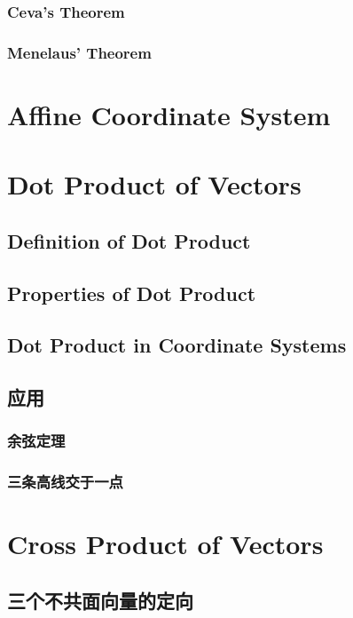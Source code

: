 \documentclass[onecolumn]{ctexart}
\begin{document}
\subsubsection{Ceva's Theorem}

\subsubsection{Menelaus' Theorem}

\section{Affine Coordinate System}

\section{Dot Product of Vectors}

\subsection{Definition of Dot Product}

\subsection{Properties of Dot Product}

\subsection{Dot Product in Coordinate Systems}

\subsection{应用}

\subsubsection{余弦定理}

\subsubsection{三条高线交于一点}

\section{Cross Product of Vectors}

\subsection{三个不共面向量的定向}
\end{document}
